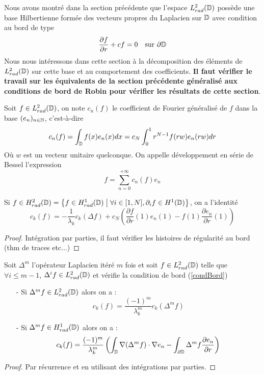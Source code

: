 \documentclass[11pt,a4paper]{article}
\begin{document}
Nous avons montré dans la section précédente que l'espace $L^2_{rad}(\mathbb{D})$ possède une base Hilbertienne formée des vecteurs propres du Laplacien sur $\mathbb{D}$ avec condition au bord de type
\begin{equation}
\label{condBord}
 \dfrac{\partial f}{\partial r} + c f = 0 \quad \textup{sur }\partial\mathbb{D}
\end{equation}
Nous nous intéressons dans cette section à la décomposition des éléments de $L^2_{rad}(\mathbb{D})$ sur cette base et au comportement des coefficients.
\textbf{Il faut vérifier le travail sur les équivalents de la section précédente généralisé aux conditions de bord de Robin pour vérifier les résultats de cette section}.

\begin{Def} Soit $f\in L^2_{rad}(\mathbb{D})$, on note $c_n(f)$ le coefficient de Fourier généralisé de $f$ dans la base $(e_n)_{n\in\mathbb{N}}$, c'est-à-dire 
\[c_n(f) = \int_{\mathbb{D}} f(x)e_n(x)dx = c_N \int_{0}^1 r^{N-1} f(rw) e_n(rw) dr \]
Où $w$ est un vecteur unitaire quelconque. 
On appelle développement en série de Bessel l'expression \[ f = \sum_{n=0}^{+\infty} c_n(f) e_n \]

\end{Def}

\begin{Prop} Si $f \in H^2_{rad}(\mathbb{D}) = \left\{f\in H^1_{rad}(\mathbb{D})\mathrel{}\middle|\mathrel{}\forall i \in [1,N], \partial_if \in H^1(\mathbb{D})\right\}$, on a l'identité 
\[ c_k(f) = -\frac{1}{\lambda_k} c_k(\Delta f) + c_N\left( \dfrac{\partial f}{\partial r}(1) e_n(1) - f(1) \dfrac{\partial e_n}{\partial r}(1)\right)\]
\begin{proof}
Intégration par parties, il faut vérifier les histoires de régularité au bord (thm de traces etc...) 
\end{proof}
\end{Prop}

\begin{Prop} Soit $\Delta^m$ l'opérateur Laplacien itéré $m$ fois et soit $f \in L^2_{rad}(\mathbb{D})$ telle que $\forall i \leq m-1$, $\Delta^i f \in L^2_{rad}(\mathbb{D})$ et vérifie la condition de bord (\ref{condBord}) 
\begin{itemize}
\item[-] Si $\Delta^m f \in L^2_{rad}(\mathbb{D})$ alors on a : 
\begin{equation}
c_k(f) = \dfrac{(-1)^m}{\lambda_k^m}c_k(\Delta^m f)
\label{coeffPair}
 \end{equation}
\item[-] Si $\Delta^m f \in H^1_{rad}(\mathbb{D})$ alors on a : 
\begin{equation}
\label{coeffImpair}
c_k(f) = \dfrac{(-1)^m}{\lambda_k^{m}}\left(\int_{\mathbb{D}}\nabla(\Delta^m f)\cdot\nabla e_n- \int_{\partial\mathbb{D}} \Delta^m f\dfrac{\partial e_n}{\partial r}\right)
\end{equation} 
\end{itemize} 
\begin{proof}
Par récurrence et en utilisant des intégrations par parties.
\end{proof}
\end{Prop}
\end{document}
